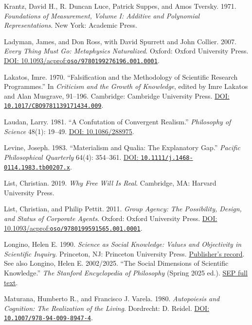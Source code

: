 \documentclass[
  english,
  11pt,
  oneside]{book}
\begin{document}
Krantz, David H., R. Duncan Luce, Patrick Suppes, and Amos Tversky. 1971. \emph{Foundations of Measurement, Volume I: Additive and Polynomial Representations}. New York: Academic Press.

Ladyman, James, and Don Ross, with David Spurrett and John Collier. 2007. \emph{Every Thing Must Go: Metaphysics Naturalized}. Oxford: Oxford University Press. \href{https://doi.org/10.1093/acprof:oso/9780199276196.001.0001}{DOI: 10.1093/acprof:\nolinkurl{oso/9780199276196.001.0001}}.

Lakatos, Imre. 1970. ``Falsification and the Methodology of Scientific Research Programmes.'' In \emph{Criticism and the Growth of Knowledge}, edited by Imre Lakatos and Alan Musgrave, 91--196. Cambridge: Cambridge University Press. \href{https://doi.org/10.1017/CBO9781139171434.009}{DOI: \nolinkurl{10.1017/CBO9781139171434.009}}.

Laudan, Larry. 1981. ``A Confutation of Convergent Realism.'' \emph{Philosophy of Science} 48(1): 19--49. \href{https://doi.org/10.1086/288975}{DOI: 10.1086/288975}.

Levine, Joseph. 1983. ``Materialism and Qualia: The Explanatory Gap.'' \emph{Pacific Philosophical Quarterly} 64(4): 354--361. \href{https://doi.org/10.1111/j.1468-0114.1983.tb00207.x}{DOI: \nolinkurl{10.1111/j.1468-0114.1983.tb00207.x}}.

List, Christian. 2019. \emph{Why Free Will Is Real}. Cambridge, MA: Harvard University Press.

List, Christian, and Philip Pettit. 2011. \emph{Group Agency: The Possibility, Design, and Status of Corporate Agents}. Oxford: Oxford University Press. \href{https://doi.org/10.1093/acprof:oso/9780199591565.001.0001}{DOI: 10.1093/acprof:\nolinkurl{oso/9780199591565.001.0001}}.

Longino, Helen E. 1990. \emph{Science as Social Knowledge: Values and Objectivity in Scientific Inquiry}. Princeton, NJ: Princeton University Press. \href{https://press.princeton.edu/books/paperback/9780691020518/science-as-social-knowledge}{Publisher's record}. See also Longino, Helen E. 2002/2025. ``The Social Dimensions of Scientific Knowledge.'' \emph{The Stanford Encyclopedia of Philosophy} (Spring 2025 ed.). \href{https://plato.stanford.edu/entries/scientific-knowledge-social/}{SEP full text}.

Maturana, Humberto R., and Francisco J. Varela. 1980. \emph{Autopoiesis and Cognition: The Realization of the Living}. Dordrecht: D. Reidel. \href{https://doi.org/10.1007/978-94-009-8947-4}{DOI: \nolinkurl{10.1007/978-94-009-8947-4}}.
\end{document}
